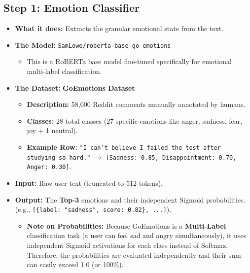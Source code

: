 \documentclass[12pt,a4paper]{article}
\begin{document}
\subsection{Step 1: Emotion Classifier}
\begin{itemize}
    \item \textbf{What it does:} Extracts the granular emotional state from the text.
    \item \textbf{The Model:} \texttt{SamLowe/roberta-base-go\_emotions}
    \begin{itemize}
        \item This is a RoBERTa base model fine-tuned specifically for emotional multi-label classification.
    \end{itemize}
    \item \textbf{The Dataset:} \textbf{GoEmotions Dataset}
    \begin{itemize}
        \item \textbf{Description:} 58,000 Reddit comments manually annotated by humans.
        \item \textbf{Classes:} 28 total classes (27 specific emotions like anger, sadness, fear, joy + 1 neutral).
        \item \textbf{Example Row:} \texttt{"I can't believe I failed the test after studying so hard."} $\rightarrow$ \texttt{[Sadness: 0.85, Disappointment: 0.70, Anger: 0.30]}.
    \end{itemize}
    \item \textbf{Input:} Raw user text (truncated to 512 tokens).
    \item \textbf{Output:} The \textbf{Top-3} emotions and their independent Sigmoid probabilities. (e.g., \texttt{[\{label: "sadness", score: 0.82\}, ...]}).
    \begin{itemize}
        \item \textbf{Note on Probabilities:} Because GoEmotions is a \textbf{Multi-Label} classification task (a user can feel sad and angry simultaneously), it uses independent Sigmoid activations for each class instead of Softmax. Therefore, the probabilities are evaluated independently and their sum can easily exceed 1.0 (or 100\%).
    \end{itemize}
\end{itemize}
\end{document}
